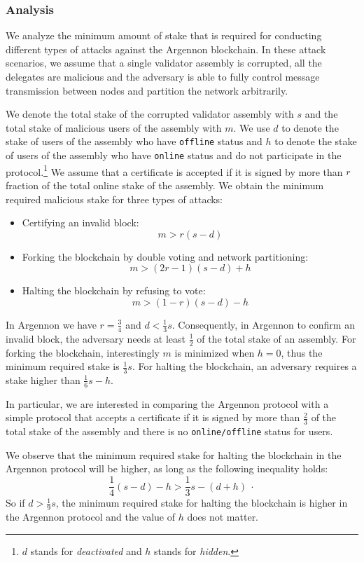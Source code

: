 \subsubsection{Analysis}

We analyze the minimum amount of stake that is required for conducting different types of attacks against the Argennon
blockchain. In these attack scenarios, we assume that a single validator assembly is corrupted, all the delegates
are malicious and the adversary is able to fully control message transmission between nodes and partition the network
arbitrarily.

We denote the total stake of the corrupted validator assembly with $s$ and the total stake of malicious users of the
assembly with $m$. We use $d$ to denote the stake of users of the assembly who have \texttt{offline} status and $h$
to denote the stake of users of the assembly who have \texttt{online} status and do not participate in the
protocol.\footnote{$d$ stands for \emph{deactivated} and $h$ stands for \emph{hidden}.} We assume
that a certificate is accepted if it is signed by more than $r$ fraction of the total online stake of the assembly.
We obtain the minimum required malicious stake for three types of attacks:
\begin{itemize}
    \item Certifying an invalid block:
    \[ m > r(s-d) \]
    \item Forking the blockchain by double voting and network partitioning:
    \[m > (2r-1)(s-d)+h \]
    \item Halting the blockchain by refusing to vote:
    \[m > (1-r)(s-d)-h \]
\end{itemize}

In Argennon we have $r=\frac{3}{4}$ and $d < \frac{1}{3}s$.
Consequently, in Argennon to confirm an invalid block, the adversary needs at least $\frac{1}{2}$ of the total stake
of an assembly. For forking the blockchain, interestingly $m$ is
minimized when $h=0$, thus the minimum required stake is $\frac{1}{3}s$. For halting the blockchain,
an adversary requires a stake higher than $\frac{1}{6}s-h$.

In particular, we are interested in comparing the Argennon protocol with a simple protocol that accepts a certificate
if it is signed by more than $\frac{2}{3}$ of the total stake of the assembly and there is no \texttt{online/offline}
status for users.

We observe that the minimum required stake for halting the blockchain in the Argennon protocol will be higher, as
long as the
following inequality holds:
\[
    \frac{1}{4}(s-d)-h > \frac{1}{3}s-(d+h)\ \cdot
\]
So if $d>\frac{1}{9}s$, the minimum required stake for halting the blockchain is higher in the
Argennon protocol and the value of $h$ does not matter.

